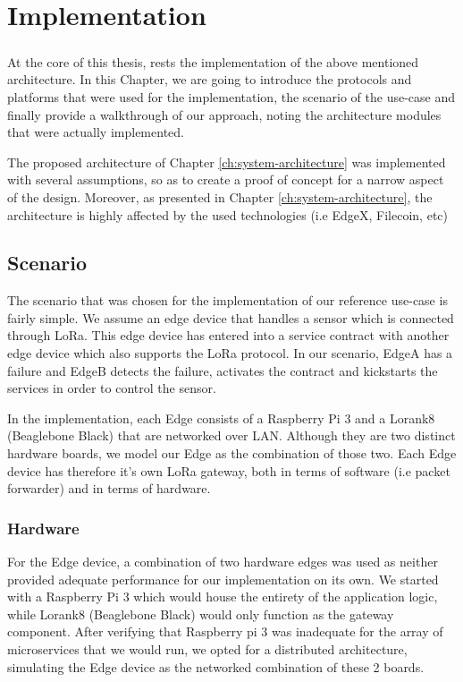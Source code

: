 \chapter{Implementation} \label{ch:implementation}

\paragraph{}

At the core of this thesis, rests the implementation of the above mentioned architecture. In this Chapter, we are going to introduce the protocols and platforms that were used for the implementation, the scenario of the use-case and finally provide a walkthrough of our approach, noting the architecture modules that were actually implemented.

The proposed architecture of Chapter \ref{ch:system-architecture} was implemented with several assumptions, so as to create a proof of concept for a narrow aspect of the design. Moreover, as presented in Chapter \ref{ch:system-architecture}, the architecture is highly affected by the used technologies (i.e EdgeX, Filecoin, etc)

\section{Scenario}

The scenario that was chosen for the implementation of our reference use-case is fairly simple. We assume an edge device that handles a sensor which is connected through LoRa. This edge device has entered into a service contract with another edge device which also supports the LoRa protocol. In our scenario, EdgeA has a failure and EdgeB detects the failure, activates the contract and kickstarts the services in order to control the sensor.

In the implementation, each Edge consists of a Raspberry Pi 3 and a Lorank8 (Beaglebone Black) that are networked over LAN. Although they are two distinct hardware boards, we model our Edge as the combination of those two. Each Edge device has therefore it’s own LoRa gateway, both in terms of software (i.e packet forwarder) and in terms of hardware.


\subsection{Hardware}

For the Edge device, a combination of two hardware edges was used as neither provided adequate performance for our implementation on its own. We started with a Raspberry Pi 3 which would house the entirety of the application logic, while Lorank8 (Beaglebone Black) would only function as the gateway component. After verifying that Raspberry pi 3 was inadequate for the array of microservices that we would run, we opted for a distributed architecture, simulating the Edge device as the networked combination of these 2 boards.


